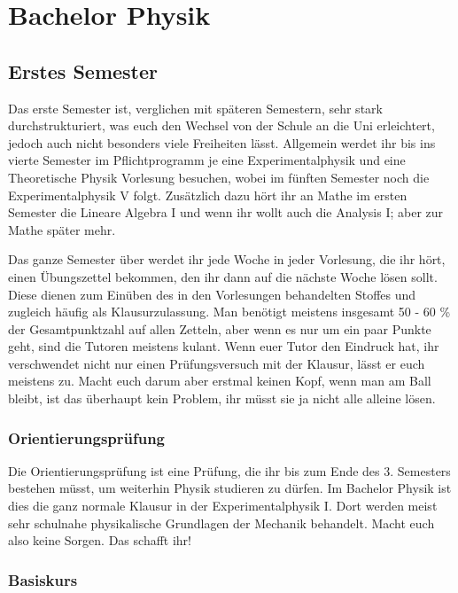 
\section{Bachelor Physik}

\subsection{Erstes Semester}

Das erste Semester ist, verglichen mit späteren Semestern, sehr stark durchstrukturiert, was euch den Wechsel von der Schule an die Uni erleichtert, jedoch auch nicht besonders viele Freiheiten lässt.
Allgemein werdet ihr bis ins vierte Semester im Pflichtprogramm je eine Experimentalphysik und eine Theoretische Physik Vorlesung besuchen, wobei im fünften Semester noch die Experimentalphysik V folgt. Zusätzlich dazu hört ihr an Mathe im ersten Semester die Lineare Algebra I und wenn ihr wollt auch die Analysis I; aber zur Mathe später mehr.

Das ganze Semester über werdet ihr jede Woche in jeder Vorlesung, die ihr hört, einen Übungszettel bekommen, den ihr dann auf die nächste Woche lösen sollt. Diese dienen zum Einüben des in den Vorlesungen behandelten Stoffes und zugleich häufig als Klausurzulassung. Man benötigt meistens insgesamt 50 - 60 \% der Gesamtpunktzahl auf allen Zetteln, aber wenn es nur um ein paar Punkte geht, sind die Tutoren meistens kulant. Wenn euer Tutor den Eindruck hat, ihr verschwendet nicht nur einen Prüfungsversuch mit der Klausur, lässt er euch meistens zu. Macht euch darum aber erstmal keinen Kopf, wenn man am Ball bleibt, ist das überhaupt kein Problem, ihr müsst sie ja nicht alle alleine lösen.

\subsubsection{Orientierungsprüfung}

Die Orientierungsprüfung ist eine Prüfung, die ihr bis zum Ende des 3. Semesters bestehen müsst, um weiterhin Physik studieren zu dürfen. Im Bachelor Physik ist dies die ganz normale Klausur in der Experimentalphysik I. Dort werden meist sehr schulnahe physikalische Grundlagen der Mechanik behandelt. Macht euch also keine Sorgen. Das schafft ihr!

\subsubsection{Basiskurs}


